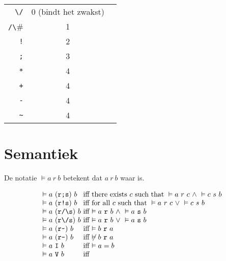 \documentclass[11pt,a4paper,fleqn,oneside]{article}
\begin{document}
\begin{tabular}{rcl}
	\verb#\/#& 0 (bindt het zwakst)\\
	\verb#/\#& 1\\
	\verb#!#& 2\\
	\verb#;#& 3\\
	\verb#*#& 4\\
	\verb#+#& 4\\
	\verb#-#& 4\\
	\verb#~#& 4\\
\end{tabular}

\section{Semantiek}
	De notatie \(\vDash a\ r\ b\) betekent dat $a\ r\ b$ waar is.

\[\begin{array}{l@{\ \text{iff}\ }l}
\vDash a\ (\verb#r;s#)\ b&\text{there exists $c$ such that}\ \vDash a\ r\ c\ \wedge\ \vDash c\ s\ b\\
\vDash a\ (\verb#r!s#)\ b&\text{for all $c$ such that}\ \vDash a\ r\ c\ \vee\ \vDash c\ s\ b\\
\vDash a\ (\verb#r/\s#)\ b&\vDash a\ \verb#r#\ b\ \wedge\ \vDash a\ \verb#s#\ b\\
\vDash a\ (\verb#r\/s#)\ b&\vDash a\ \verb#r#\ b\ \vee\ \vDash a\ \verb#s#\ b\\
\vDash a\ (\verb#r~#)\ b&\vDash b\ \verb#r#\ a\\
\vDash a\ (\verb#r-#)\ b&\not\vDash b\ \verb#r#\ a\\
\vDash a\ \verb#I#\ b&\vDash a=b\\
\vDash a\ \verb#V#\ b\\
\end{array}\]
\end{document}
